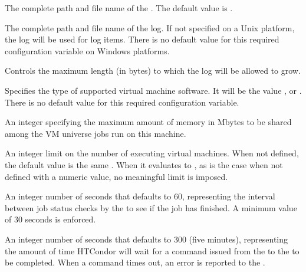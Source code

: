 \begin{description}
\label{param:VMGAHPServer}
\item[\Macro{VM\_GAHP\_SERVER}]
  The complete path and file name of the .
  The default value is .

\label{param:VMGAHPLog}
\item[\Macro{VM\_GAHP\_LOG}]
  The complete path and file name of the  log.
  If not specified on a Unix platform, the 
  log will be used for  log items. 
  There is no default value for this required configuration variable
  on Windows platforms.

\label{param:MaxVMGAHPLog}
\item[\Macro{MAX\_VM\_GAHP\_LOG}]
  Controls the maximum length (in bytes) to which the  log
  will be allowed to grow.

\label{param:VMType}
\item[\Macro{VM\_TYPE}]
  Specifies the type of supported virtual machine software.
  It will be the value \verb@kvm@, \verb@xen@ or \verb@vmware@.
  There is no default value for this required configuration variable.

\label{param:VMMemory}
\item[\Macro{VM\_MEMORY}]
  An integer specifying the maximum amount of memory in Mbytes
  to be shared among the VM universe jobs run on this machine.

\label{param:VMMaxNumber}
\item[\Macro{VM\_MAX\_NUMBER}]
  An integer limit on the number of executing virtual machines.
  When not defined, the default value is the same .
  When it evaluates to ,
  as is the case when not defined with a numeric value,
  no meaningful limit is imposed.

\label{param:VMStatusInterval}
\item[\Macro{VM\_STATUS\_INTERVAL}]
  An integer number of seconds that defaults to 60,
  representing the interval between job status checks by the
   to see if the job has finished.
  A minimum value of 30 seconds is enforced.

\label{param:VMGAHPReqTimeout}
\item[\Macro{VM\_GAHP\_REQ\_TIMEOUT}]
  An integer number of seconds that defaults to 300 (five minutes),
  representing the amount of time HTCondor will wait for a command issued
  from the  to the  to be completed.
  When a command times out, an error is reported to the .


\end{description}
